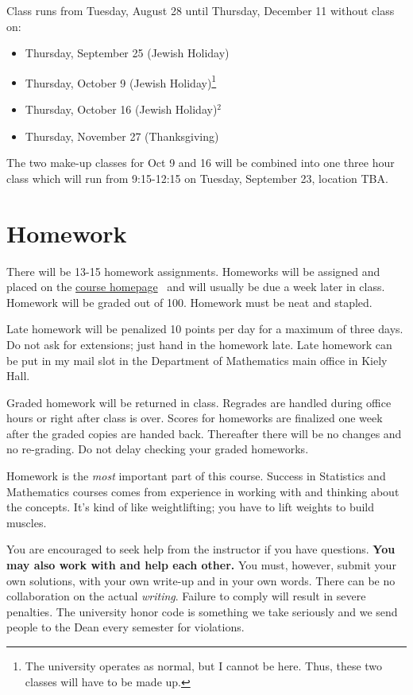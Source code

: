 \documentclass[12pt]{article}
\newcommand{\ingreen}[1]{\color{green}\textbf{#1} \color{black}}
\newcommand{\coursewebpage}{\href{https://github.com/kapelner/QC_Math_241_Fall_2014_15}{course homepage}}
\begin{document}
Class runs from Tuesday, August 28 until Thursday, December 11 without class on:

\begin{itemize}
\itemsep -0.0em 
\item Thursday, September 25 (Jewish Holiday)
\item Thursday, October 9 (Jewish Holiday)\footnote{The university operates as normal, but I cannot be here. Thus, these two classes will have to be made up.}
\item Thursday, October 16 (Jewish Holiday)$^2$
\item Thursday, November 27 (Thanksgiving)
\end{itemize}

The two make-up classes for Oct 9 and 16 will be combined into one three hour class which will run from 9:15-12:15 on Tuesday, September 23, location TBA.


\section*{Homework}

There will be 13-15 homework assignments. Homeworks will be assigned and placed on the \coursewebpage~ and will usually be due a week later in class. Homework will be graded out of 100. Homework must be neat and stapled. 

Late homework will be penalized 10 points per day for a maximum of three days. Do not ask for extensions; just hand in the homework late. Late homework can be put in my mail slot in the Department of Mathematics main office in Kiely Hall.

Graded homework will be returned in class. Regrades are handled during office hours or right after class is over. Scores for homeworks are finalized one week after the graded copies are handed back. Thereafter there will be no changes and no re-grading. Do not delay checking your graded homeworks.

Homework is the \textit{most} important part of this course. Success in Statistics and Mathematics courses comes from experience in working with and thinking about the concepts. It's kind of like weightlifting; you have to lift weights to build muscles.

You are encouraged to seek help from the instructor if you have questions. \ingreen{You may also work with and help each other.} You must, however, submit your own solutions, with your own write-up and in your own words. There can be no collaboration on the actual \textit{writing}. Failure to comply will result in severe penalties. The university honor code is something we take seriously and we send people to the Dean every semester for violations.
\end{document}
